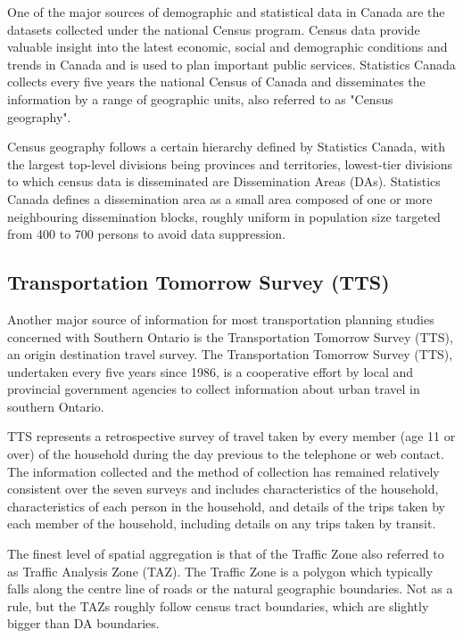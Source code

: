 One of the major sources of demographic and statistical data in Canada are the datasets collected under the national Census program.
Census data provide valuable insight into the latest economic, social and demographic conditions and trends in Canada and is used to plan important public services.
Statistics Canada collects every five years the national Census of Canada and disseminates the information by a range of geographic units, also referred to as "Census geography"\cite{MapandDataLibrary2019}.

Census geography follows a certain hierarchy defined by Statistics Canada, with the largest top-level divisions being provinces and territories, lowest-tier divisions to which census data is disseminated are Dissemination Areas (DAs)\cite{StatisticsCanada2018}.
Statistics Canada defines a dissemination area as a small area composed of one or more neighbouring dissemination blocks, roughly uniform in population size targeted from 400 to 700 persons to avoid data suppression\cite{StatisticsCanada2015}.

\subsection{Transportation Tomorrow Survey (TTS)} \label{subsec:tts_description}

Another major source of information for most transportation planning studies concerned with Southern Ontario is the Transportation Tomorrow Survey (TTS)\cite{DataManagementGroup2014}, an origin destination travel survey.
The Transportation Tomorrow Survey (TTS), undertaken every five years since 1986, is a cooperative effort by local and provincial government agencies to collect information about urban travel in southern Ontario.

TTS represents a retrospective survey of travel taken by every member (age 11 or over) of the household during the day previous to the telephone or web contact.
The information collected and the method of collection has remained relatively consistent over the seven surveys and includes characteristics of the household, characteristics of each person in the household, and details of the trips taken by each member of the household, including details on any trips taken by transit\cite{Ashby2018}.

The finest level of spatial aggregation is that of the Traffic Zone also referred to as Traffic Analysis Zone (TAZ).
The Traffic Zone is a polygon which typically falls along the centre line of roads or the natural geographic boundaries\cite{DataManagementGroup2019}.
Not as a rule, but the TAZs roughly follow census tract boundaries, which are slightly bigger than DA boundaries.

